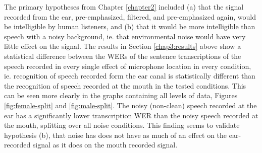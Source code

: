 

The primary hypotheses from Chapter \ref{chapter2} included (a) that the signal recorded from the ear, pre-emphasized, filtered, and pre-emphasized again, would be intelligible by human listeners, and (b) that it would be more intelligible than speech with a noisy background, ie. that environmental noise would have very little effect on the signal.  The results in Section \ref{chap3:results} above show a statistical difference between the WERs of the sentence transcriptions of the speech recorded in every single effect of microphone location in every condition, ie. recognition of speech recorded form the ear canal is statistically different than the recognition of speech recorded at the mouth in the tested conditions.  This can be seen more clearly in the graphs containing all levels of data, Figures \ref{fig:female-split} and \ref{fig:male-split}.  The noisy (non-clean) speech recorded at the ear has a significantly lower transcription WER than the noisy speech recorded at the mouth, splitting over all noise conditions.  This finding seems to validate hypothesis (b), that noise has does not have as much of an effect on the ear-recorded signal as it does on the mouth recorded signal.


